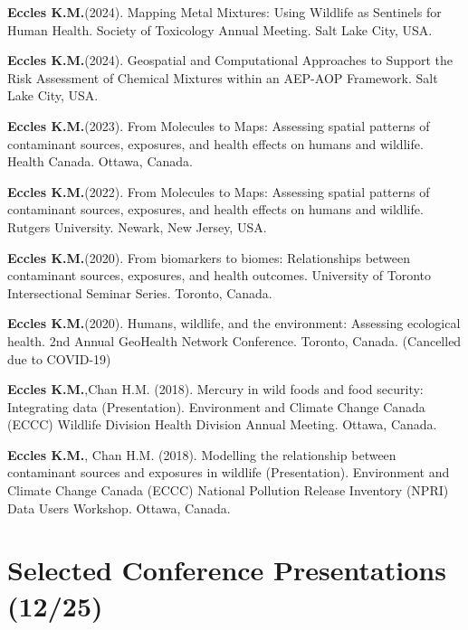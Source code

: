 \documentclass[margin,line]{res}
\begin{document}
\begin{resume}
\begin{etaremune}[start=9]
\item \textbf{Eccles K.M.}(2024). Mapping Metal Mixtures: Using Wildlife as Sentinels for Human Health. Society of Toxicology Annual Meeting. Salt Lake City, USA.

\item \textbf{Eccles K.M.}(2024). Geospatial and Computational Approaches to Support the Risk Assessment of Chemical Mixtures within an AEP-AOP Framework. Salt Lake City, USA.

\item \textbf{Eccles K.M.}(2023). From Molecules to Maps: Assessing spatial patterns of contaminant sources, exposures, and health effects on humans and wildlife. Health Canada. Ottawa, Canada.

\item \textbf{Eccles K.M.}(2022). From Molecules to Maps: Assessing spatial patterns of contaminant sources, exposures, and health effects on humans and wildlife. Rutgers University. Newark, New Jersey, USA.

\item \textbf{Eccles K.M.}(2020). From biomarkers to biomes: Relationships between contaminant sources, exposures, and health outcomes. University of Toronto Intersectional Seminar Series. Toronto, Canada.

\item \textbf{Eccles K.M.}(2020). Humans, wildlife, and the environment: Assessing ecological health. 2nd Annual GeoHealth Network Conference. Toronto, Canada. (Cancelled due to COVID-19)

\item \textbf{Eccles K.M.},Chan H.M. (2018). Mercury in wild foods and food security: Integrating data (Presentation). Environment and Climate Change Canada (ECCC) Wildlife Division Health Division Annual Meeting. Ottawa, Canada.

\item \textbf{Eccles K.M.}, Chan H.M. (2018). Modelling the relationship between contaminant sources and exposures in wildlife (Presentation). Environment and Climate Change Canada (ECCC) National Pollution Release Inventory (NPRI) Data Users Workshop. Ottawa, Canada.
\end{etaremune}

\vspace*{.1in}
\section{\sc Selected Conference Presentations (12/25)}


\end{resume}
\end{document}

